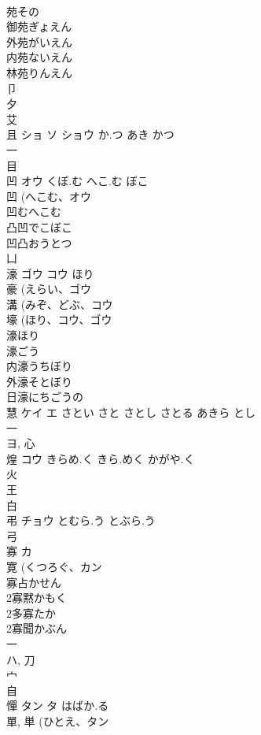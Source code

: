 \documentclass[8pt]{extreport}
\begin{document}
\begin{CJK}{UTF8}{min}
\\	苑その 
\\	御苑ぎょえん 
\\	外苑がいえん 
\\	内苑ないえん 
\\	林苑りんえん 
\\	卩 
\\	夕 
\\	艾 
\\	且	ショ ソ ショウ	か.つ あき かつ	
\\	一 
\\	目 
\\	凹	オウ	くぼ.む へこ.む ぼこ	
\\	凹 (へこむ、オウ 
\\	凹むへこむ
\\	凸凹でこぼこ
\\	凹凸おうとつ
\\	凵 
\\	濠	ゴウ コウ	ほり	
\\	豪 (えらい、ゴウ 
\\	溝 (みぞ、どぶ、コウ 
\\	壕 (ほり、コウ、ゴウ 
\\	濠ほり
\\	濠ごう
\\	内濠うちぼり
\\	外濠そとぼり
\\	日濠にちごうの
\\	慧	ケイ エ	さとい さと さとし さとる あきら とし	
\\	一 
\\	ヨ, 心 
\\	煌	コウ	きらめ.く きら.めく かがや.く	
\\	火 
\\	王 
\\	白 
\\	弔	チョウ	とむら.う とぶら.う	
\\	弓 
\\	寡	カ		
\\	寛 (くつろぐ、カン 
\\	寡占かせん
\\	2寡黙かもく
\\	2多寡たか
\\	2寡聞かぶん
\\	一 
\\	ハ, 刀 
\\	宀 
\\	自 
\\	憚	タン タ	はばか.る	
\\	單, 単 (ひとえ、タン 

\end{CJK}
\end{document}
